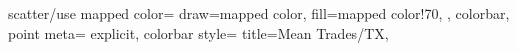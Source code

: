 scatter/use mapped color={
            draw=mapped color,
            fill=mapped color!70,
        }, colorbar, point meta= explicit, 
    colorbar style={
        title={Mean Trades/TX},
        }
